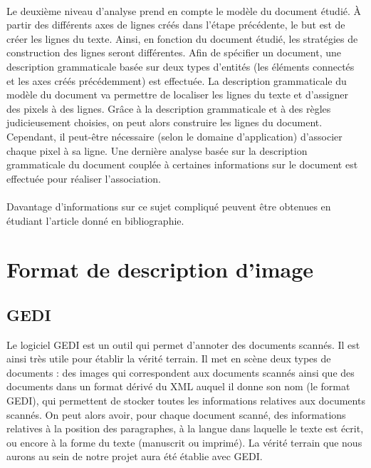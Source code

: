 \paragraph{}
Le deuxième niveau d'analyse prend en compte le modèle du document étudié. À partir des différents axes de lignes créés dans l'étape
précédente, le but est de créer les lignes du texte. Ainsi, en fonction du document étudié, les stratégies de construction des lignes
seront différentes. Afin de spécifier un document, une description grammaticale basée sur deux types d'entités (les éléments connectés
et les axes créés précédemment) est effectuée. La description grammaticale du modèle du document va permettre de localiser les lignes
du texte et d'assigner des pixels à des lignes. Grâce à la description grammaticale et à des règles judicieusement choisies, on peut alors
construire les lignes du document. Cependant, il peut-être nécessaire (selon le domaine d'application) d'associer chaque pixel à sa ligne.
Une dernière analyse basée sur la description grammaticale du document couplée à certaines informations sur le document
est effectuée pour réaliser l'association.

\paragraph{}
Davantage d'informations sur ce sujet compliqué peuvent être obtenues en étudiant l'article\cite{cdbn:2009} donné en bibliographie.

\section{Format de description d'image}

\subsection{GEDI}

Le logiciel GEDI est un outil qui permet d'annoter des documents scannés. Il est ainsi très utile pour établir
la vérité terrain. Il met en scène deux types de documents : des images qui correspondent aux documents
scannés ainsi que des documents dans un format dérivé du XML auquel il donne son nom (le format GEDI), qui
permettent de stocker toutes les informations relatives aux documents scannés. On peut alors avoir, pour
chaque document scanné, des informations relatives à la position des paragraphes, à la langue dans laquelle
le texte est écrit, ou encore à la forme du texte (manuscrit ou imprimé). La vérité terrain que nous aurons
au sein de notre projet aura été établie avec GEDI.

